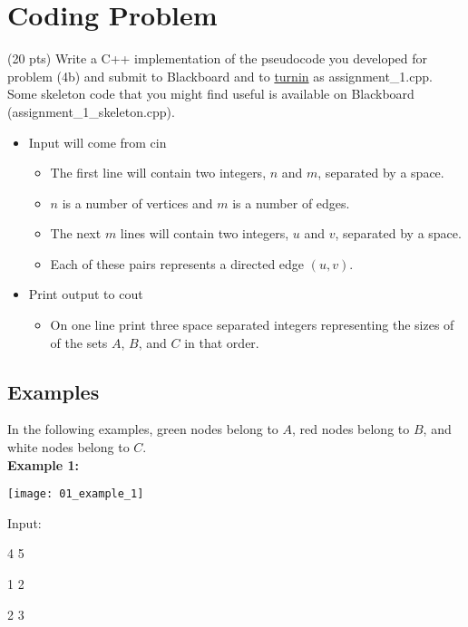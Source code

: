 \documentclass{article}
\begin{document}
\section*{Coding Problem}

\noindent (20 pts) Write a C++ implementation of the pseudocode you developed for problem (4b) and submit to Blackboard and to \href{https://turnin.ecst.csuchico.edu/}{turnin} as assignment\_1.cpp. Some skeleton code that you might find useful is available on Blackboard (assignment\_1\_skeleton.cpp).

\begin{itemize}
    \item Input will come from cin
    \begin{itemize}
        \item The first line will contain two integers, $n$ and $m$, separated by a space.
        \item $n$ is a number of vertices and $m$ is a number of edges.
        \item The next $m$ lines will contain two integers, $u$ and $v$, separated by a space.
        \item Each of these pairs represents a directed edge $(u,v)$.
    \end{itemize}
    \item Print output to cout
    \begin{itemize}
        \item On one line print three space separated integers representing the sizes of of the sets $A$, $B$, and $C$ in that order.
    \end{itemize}
\end{itemize}

\subsection*{Examples}

In the following examples, green nodes belong to $A$, red nodes belong to $B$, and white nodes belong to $C$. \\

\noindent \textbf{Example 1:}

\begin{center}
    \texttt{[image: 01\_example\_1]}
\end{center}

Input:

4 5

1 2

2 3
\end{document}
